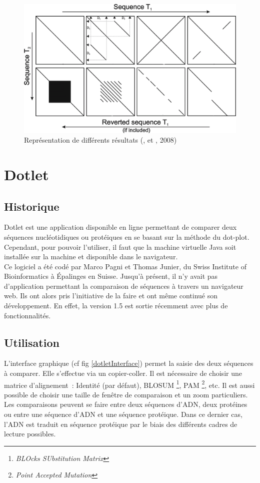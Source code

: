 \documentclass{report}
\begin{document}
\begin{figure}[!ht]
\centerline{\includegraphics[scale=0.45]{SchemaDotplot.png}}
\caption{Représentation de différents résultats (,  et , 2008)}
\label{schema}
\end{figure}

\chapter{Dotlet}
\section{Historique}
Dotlet est une application disponible en ligne permettant de comparer deux séquences nucléotidiques ou protéiques en se basant sur la méthode du dot-plot. Cependant, pour pouvoir l'utiliser, il faut que la machine virtuelle Java soit installée sur la machine et disponible dans le navigateur.\\
Ce logiciel a été codé par Marco Pagni et Thomas Junier, du Swiss Institute of Bioinformatics à Épalinges en Suisse. Jusqu'à présent, il n'y avait pas d'application permettant la comparaison de séquences à travers un navigateur web. Ils ont alors pris l'initiative de la faire et ont même continué son développement. En effet, la version 1.5 est sortie récemment avec plus de fonctionnalités.

\section{Utilisation}

L'interface graphique (cf fig \ref{dotletInterface}) permet la saisie des deux séquences à comparer. Elle s'effectue via un copier-coller. Il est nécessaire de choisir une matrice d'alignement~: Identité (par défaut), BLOSUM \footnote{\emph{BLOcks SUbstitution Matrix}}, PAM \footnote{\emph{Point Accepted Mutation}}, etc. Il est aussi possible de choisir une taille de fenêtre de comparaison et un zoom particuliers.\\
Les comparaisons peuvent se faire entre deux séquences d'ADN, deux protéines ou entre une séquence d'ADN et une séquence protéique. Dans ce dernier cas, l'ADN est traduit en séquence protéique par le biais des différents cadres de lecture possibles.\\
\end{document}
